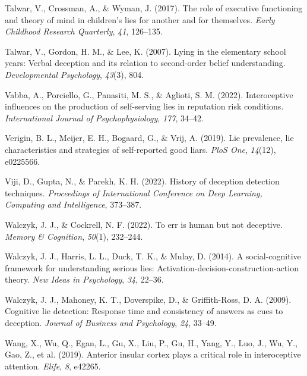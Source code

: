\documentclass[
  man,mask,floatsintext]{apa6}
\newlength{\cslhangindent}
\newlength{\cslentryspacingunit} %
\newenvironment{CSLReferences}[2] %
 {%
  \setlength{\parindent}{0pt}
  \ifodd #1
  \let\oldpar\par
  \def\par{\hangindent=\cslhangindent\oldpar}
  \fi
  \setlength{\parskip}{#2\cslentryspacingunit}
 }%
 {}
\begin{document}
\begin{CSLReferences}{1}{0}
\leavevmode{}%
Talwar, V., Crossman, A., \& Wyman, J. (2017). The role of executive functioning and theory of mind in children's lies for another and for themselves. \emph{Early Childhood Research Quarterly}, \emph{41}, 126--135.

\leavevmode{}%
Talwar, V., Gordon, H. M., \& Lee, K. (2007). Lying in the elementary school years: Verbal deception and its relation to second-order belief understanding. \emph{Developmental Psychology}, \emph{43}(3), 804.

\leavevmode{}%
Vabba, A., Porciello, G., Panasiti, M. S., \& Aglioti, S. M. (2022). Interoceptive influences on the production of self-serving lies in reputation risk conditions. \emph{International Journal of Psychophysiology}, \emph{177}, 34--42.

\leavevmode{}%
Verigin, B. L., Meijer, E. H., Bogaard, G., \& Vrij, A. (2019). Lie prevalence, lie characteristics and strategies of self-reported good liars. \emph{PloS One}, \emph{14}(12), e0225566.

\leavevmode{}%
Viji, D., Gupta, N., \& Parekh, K. H. (2022). History of deception detection techniques. \emph{Proceedings of International Conference on Deep Learning, Computing and Intelligence}, 373--387.

\leavevmode{}%
Walczyk, J. J., \& Cockrell, N. F. (2022). To err is human but not deceptive. \emph{Memory \& Cognition}, \emph{50}(1), 232--244.

\leavevmode{}%
Walczyk, J. J., Harris, L. L., Duck, T. K., \& Mulay, D. (2014). A social-cognitive framework for understanding serious lies: Activation-decision-construction-action theory. \emph{New Ideas in Psychology}, \emph{34}, 22--36.

\leavevmode{}%
Walczyk, J. J., Mahoney, K. T., Doverspike, D., \& Griffith-Ross, D. A. (2009). Cognitive lie detection: Response time and consistency of answers as cues to deception. \emph{Journal of Business and Psychology}, \emph{24}, 33--49.

\leavevmode{}%
Wang, X., Wu, Q., Egan, L., Gu, X., Liu, P., Gu, H., Yang, Y., Luo, J., Wu, Y., Gao, Z., et al. (2019). Anterior insular cortex plays a critical role in interoceptive attention. \emph{Elife}, \emph{8}, e42265.


\end{CSLReferences}
\end{document}
